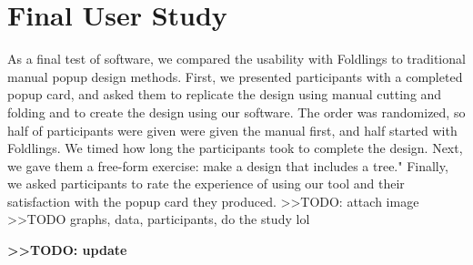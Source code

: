 \section{Final User Study}\label{final-user-study}

As a final test of software, we compared the usability with Foldlings to
traditional manual popup design methods. First, we presented
participants with a completed popup card, and asked them to replicate
the design using manual cutting and folding and to create the design
using our software. The order was randomized, so half of participants
were given were given the manual first, and half started with Foldlings.
We timed how long the participants took to complete the design. Next, we
gave them a free-form exercise: make a design that includes a tree."
Finally, we asked participants to rate the experience of using our tool
and their satisfaction with the popup card they produced.
\textgreater{}\textgreater{}TODO: attach image
\textgreater{}\textgreater{}TODO graphs, data, participants, do the
study lol

\textbf{\textgreater{}\textgreater{}TODO: update}
